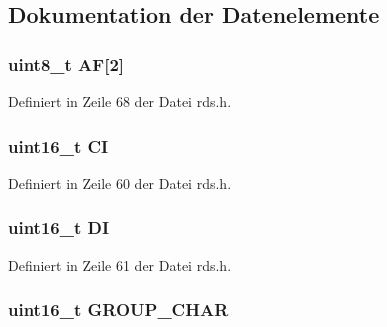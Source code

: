 \subsection{Dokumentation der Datenelemente}
\hypertarget{structgroup__0a_ae5a8515ae995b21e542b2ad52b20c34e}{}
\subsubsection[{A\+F}]{\setlength{\rightskip}{0pt plus 5cm}uint8\+\_\+t A\+F\mbox{[}2\mbox{]}}\label{structgroup__0a_ae5a8515ae995b21e542b2ad52b20c34e}


Definiert in Zeile 68 der Datei rds.\+h.

\hypertarget{structgroup__0a_aa6fd8556e02ce89fed23057f1cb37e44}{}
\subsubsection[{C\+I}]{\setlength{\rightskip}{0pt plus 5cm}uint16\+\_\+t C\+I}\label{structgroup__0a_aa6fd8556e02ce89fed23057f1cb37e44}


Definiert in Zeile 60 der Datei rds.\+h.

\hypertarget{structgroup__0a_ad020d0abff338c9c34924a44478ac591}{}
\subsubsection[{D\+I}]{\setlength{\rightskip}{0pt plus 5cm}uint16\+\_\+t D\+I}\label{structgroup__0a_ad020d0abff338c9c34924a44478ac591}


Definiert in Zeile 61 der Datei rds.\+h.

\hypertarget{structgroup__0a_a66d4119990dc4c3e040a43885e9bb953}{}
\subsubsection[{G\+R\+O\+U\+P\+\_\+\+C\+H\+A\+R}]{\setlength{\rightskip}{0pt plus 5cm}uint16\+\_\+t G\+R\+O\+U\+P\+\_\+\+C\+H\+A\+R}\label{structgroup__0a_a66d4119990dc4c3e040a43885e9bb953}


